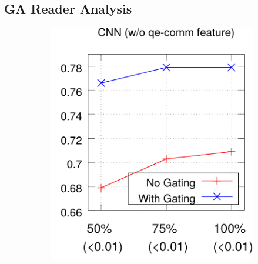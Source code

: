 \documentclass[11pt,a4paper]{article}
\begin{document}
\subsection{GA Reader Analysis}
\label{sec:ablation}
\begin{figure}[ht]
    \centering
    \caption{Performance in accuracy with and without the Gated-Attention module over different training sizes. $p$-values for an exact one-sided Mcnemar's test are given inside the parentheses for each setting.}
    \begin{subfigure}[b]{0.245\textwidth}
    \includegraphics[width=1.0\linewidth]{figures/cnn-feat0-crop}
        \label{fig:cnn_wo_f}
    \end{subfigure}
    \begin{subfigure}[b]{0.245\textwidth}

\end{subfigure}
\end{figure}
\end{document}
